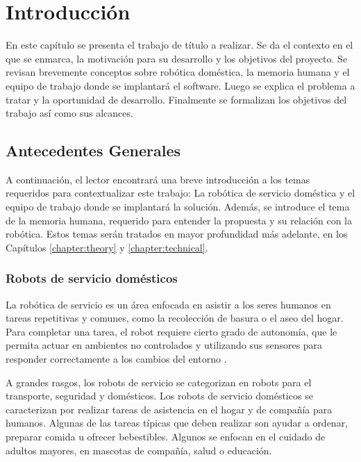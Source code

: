 \chapter{Introducción}\label{chapter:introduction}

En este capítulo se presenta el trabajo de título a realizar. Se da el contexto en el que se enmarca, la motivación para su desarrollo y los objetivos del proyecto. Se revisan brevemente conceptos sobre robótica doméstica, la memoria humana y el equipo de trabajo donde se implantará el software. Luego se explica el problema a tratar y la oportunidad de desarrollo. Finalmente se formalizan los objetivos del trabajo así como sus alcances.


\section{Antecedentes Generales}

A continuación, el lector encontrará una breve introducción a los temas requeridos para contextualizar este trabajo: La robótica de servicio doméstica y el equipo de trabajo donde se implantará la solución. Además, se introduce el tema de la memoria humana, requerido para entender la propuesta y su relación con la robótica. Estos temas serán tratados en mayor profundidad más adelante, en los Capítulos \ref{chapter:theory} y \ref{chapter:technical}.


\subsection{Robots de servicio domésticos}

La robótica de servicio es un área enfocada en asistir a los seres humanos en tareas repetitivas y comunes, como la recolección de basura o el aseo del hogar. Para completar una tarea, el robot requiere cierto grado de autonomía, que le permita actuar en ambientes no controlados y utilizando sus sensores para responder correctamente a los cambios del entorno \cite{IFR}.

A grandes rasgos, los robots de servicio se categorizan en robots para el transporte, seguridad y domésticos. Los robots de servicio domésticos se caracterizan por realizar tareas de asistencia en el hogar y de compañía para humanos. Algunas de las tareas típicas que deben realizar son ayudar a ordenar, preparar comida u ofrecer bebestibles. Algunos se enfocan en el cuidado de adultos mayores, en mascotas de compañía, salud o educación.


